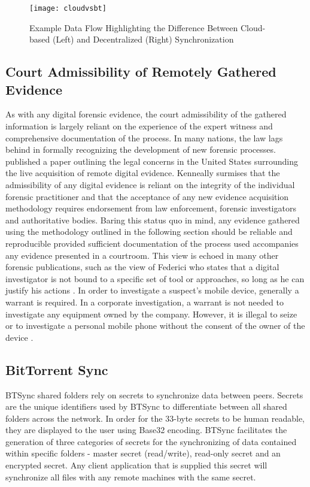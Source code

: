 \documentclass{jdfsl}
\begin{document}
\begin{figure*}[!t]
\centering
\texttt{[image: cloudvsbt]}
\caption{Example Data Flow Highlighting the Difference Between Cloud-based (Left) and Decentralized (Right) Synchronization}
\label{fig:dataflow}
\end{figure*}

\subsection{Court Admissibility of Remotely Gathered Evidence}
\label{admissibility}

As with any digital forensic evidence, the court admissibility of the gathered information is largely reliant on the experience of the expert witness and comprehensive documentation of the process. In many nations, the law lags behind in formally recognizing the development of new forensic processes. \cite{kenneally2005confluence} published a paper outlining the legal concerns in the United States surrounding the live acquisition of remote digital evidence. Kenneally surmises that the admissibility of any digital evidence is reliant on the integrity of the individual forensic practitioner and that the acceptance of any new evidence acquisition methodology requires endorsement from law enforcement, forensic investigators and authoritative bodies. Baring this status quo in mind, any evidence gathered using the methodology outlined in the following section should be reliable and reproducible provided sufficient documentation of the process used accompanies any evidence presented in a courtroom. This view is echoed in many other forensic publications, such as the view of Federici who states that a digital investigator is not bound to a specific set of tool or approaches, so long as he can justify his actions \citep{Federici201430}. In order to investigate a suspect's mobile device, generally a warrant is required. In a corporate investigation, a warrant is not needed to investigate any equipment owned by the company. However, it is illegal to seize or to investigate a personal mobile phone without the consent of the owner of the device \citep{zdziarski2008iphone}.


\subsection{BitTorrent Sync}


BTSync shared folders rely on secrets to synchronize data between peers. Secrets are the unique identifiers used by BTSync to differentiate between all shared folders across the network. In order for the 33-byte secrets to be human readable, they are displayed to the user using Base32 encoding. BTSync facilitates the generation of three categories of secrets for the synchronizing of data contained within specific folders - master secret (read/write), read-only secret and an encrypted secret. Any client application that is supplied this secret will synchronize all files with any remote machines with the same secret.
\end{document}
